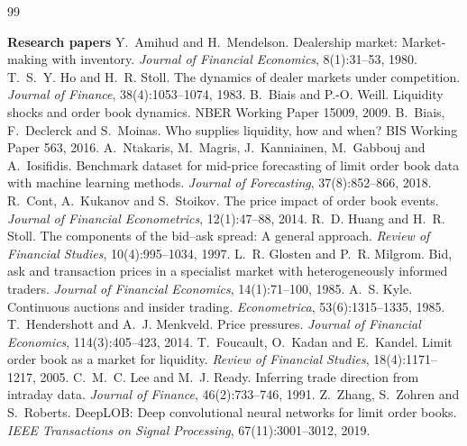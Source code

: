 \documentclass[11pt,a4paper]{article}
\begin{document}
\clearpage
{}
{}
\begin{thebibliography}{99}\small
\setlength{\itemsep}{1pt}
\item[] \textbf{Research papers}
 Y.~Amihud and H.~Mendelson. Dealership market: Market-making with inventory.
  \emph{Journal of Financial Economics}, 8(1):31--53, 1980.
 T.~S.~Y. Ho and H.~R. Stoll. The dynamics of dealer markets under competition.
  \emph{Journal of Finance}, 38(4):1053--1074, 1983.
 B.~Biais and P.-O. Weill. Liquidity shocks and order book dynamics.
  NBER Working Paper 15009, 2009.
 B.~Biais, F.~Declerck and S.~Moinas. Who supplies liquidity, how and when?
  BIS Working Paper 563, 2016.
 A.~Ntakaris, M.~Magris, J.~Kanniainen, M.~Gabbouj and A.~Iosifidis. Benchmark dataset for
  mid-price forecasting of limit order book data with machine learning methods.
  \emph{Journal of Forecasting}, 37(8):852--866, 2018.
 R.~Cont, A.~Kukanov and S.~Stoikov. The price impact of order book events.
  \emph{Journal of Financial Econometrics}, 12(1):47--88, 2014.
 R.~D. Huang and H.~R. Stoll. The components of the bid--ask spread: A general approach.
  \emph{Review of Financial Studies}, 10(4):995--1034, 1997.
 L.~R. Glosten and P.~R. Milgrom. Bid, ask and transaction prices in a specialist market with
  heterogeneously informed traders. \emph{Journal of Financial Economics}, 14(1):71--100, 1985.
 A.~S. Kyle. Continuous auctions and insider trading. \emph{Econometrica}, 53(6):1315--1335, 1985.
 T.~Hendershott and A.~J. Menkveld. Price pressures.
  \emph{Journal of Financial Economics}, 114(3):405--423, 2014.
 T.~Foucault, O.~Kadan and E.~Kandel. Limit order book as a market for liquidity.
  \emph{Review of Financial Studies}, 18(4):1171--1217, 2005.
 C.~M.~C. Lee and M.~J. Ready. Inferring trade direction from intraday data.
  \emph{Journal of Finance}, 46(2):733--746, 1991.
 Z.~Zhang, S.~Zohren and S.~Roberts. DeepLOB: Deep convolutional neural networks for limit
  order books. \emph{IEEE Transactions on Signal Processing}, 67(11):3001--3012, 2019.


\end{thebibliography}
\end{document}
